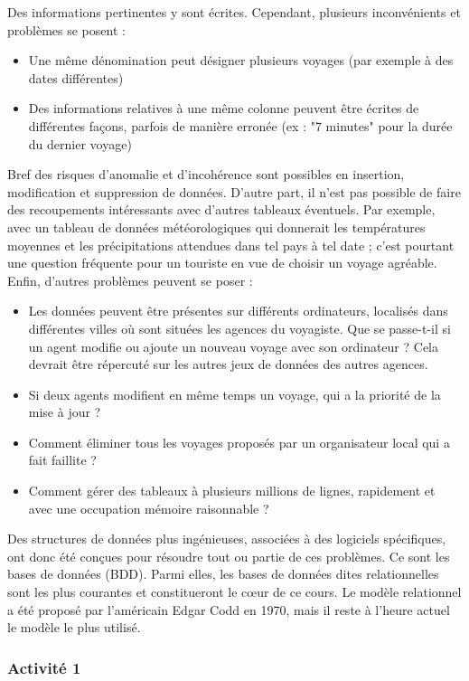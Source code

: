 \documentclass[11pt,a4paper,french,twoside]{PMCours}
\begin{document}
Des informations pertinentes y sont écrites. Cependant, plusieurs inconvénients et problèmes se posent : 
\begin{itemize}
 \item Une même dénomination peut désigner plusieurs voyages (par exemple à des dates différentes)
 \item Des informations relatives à une même colonne peuvent être écrites de différentes façons, parfois de manière erronée (ex : "7 minutes" pour la durée du dernier voyage)
\end{itemize}
Bref des risques d'anomalie et d'incohérence sont possibles en insertion, modification et suppression de données. D'autre part, il n'est pas possible de faire des recoupements intéressants avec d'autres tableaux éventuels. Par exemple, avec un tableau de données météorologiques qui donnerait les températures moyennes et les précipitations attendues dans tel pays à tel date ; c'est pourtant une question fréquente pour un touriste en vue de choisir un voyage agréable. Enfin, d'autres problèmes peuvent se poser : 
\begin{itemize}
 \item Les données peuvent être présentes sur différents ordinateurs, localisés dans différentes villes où sont situées les agences du voyagiste.  Que se passe-t-il si un agent modifie  ou ajoute un nouveau voyage avec son ordinateur ? Cela devrait être répercuté sur les autres jeux de données des autres agences.
 \item Si deux agents modifient en même temps un voyage, qui a la priorité de la mise à jour ?
 \item Comment éliminer tous les voyages proposés par un organisateur local qui a fait faillite ?
 \item Comment gérer des tableaux à plusieurs millions de lignes, rapidement et avec une occupation mémoire raisonnable ?
\end{itemize}

Des structures de données plus ingénieuses, associées à des logiciels spécifiques, ont donc été conçues pour résoudre tout ou partie de ces problèmes. Ce sont les bases de données (BDD). Parmi elles, les bases de données dites relationnelles sont les plus courantes et constitueront le cœur de ce cours. Le modèle relationnel a été proposé par l'américain Edgar Codd en 1970, mais il reste à l'heure actuel le modèle le plus utilisé.


\subsubsection*{Activité 1}
\end{document}
